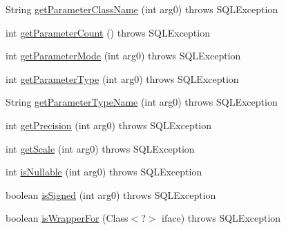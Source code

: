 \begin{DoxyCompactItemize}
\item 
String \mbox{\hyperlink{classcom_1_1mysql_1_1cj_1_1jdbc_1_1_callable_statement_1_1_callable_statement_param_info_a3ec72f90cfc41e2b5955443c7d05526f}{get\+Parameter\+Class\+Name}} (int arg0)  throws S\+Q\+L\+Exception 
\item 
int \mbox{\hyperlink{classcom_1_1mysql_1_1cj_1_1jdbc_1_1_callable_statement_1_1_callable_statement_param_info_abe8981fc3546f97212d771661cea8278}{get\+Parameter\+Count}} ()  throws S\+Q\+L\+Exception 
\item 
int \mbox{\hyperlink{classcom_1_1mysql_1_1cj_1_1jdbc_1_1_callable_statement_1_1_callable_statement_param_info_a29edc8712b31ebf3d04dc4dbda0236e2}{get\+Parameter\+Mode}} (int arg0)  throws S\+Q\+L\+Exception 
\item 
int \mbox{\hyperlink{classcom_1_1mysql_1_1cj_1_1jdbc_1_1_callable_statement_1_1_callable_statement_param_info_af4b895d1e6c4677a4b113b9639226459}{get\+Parameter\+Type}} (int arg0)  throws S\+Q\+L\+Exception 
\item 
String \mbox{\hyperlink{classcom_1_1mysql_1_1cj_1_1jdbc_1_1_callable_statement_1_1_callable_statement_param_info_a66b79721144e4632d5b4ac9b2c74defc}{get\+Parameter\+Type\+Name}} (int arg0)  throws S\+Q\+L\+Exception 
\item 
int \mbox{\hyperlink{classcom_1_1mysql_1_1cj_1_1jdbc_1_1_callable_statement_1_1_callable_statement_param_info_aa91a9357eeb55a483e3837e19753cc7b}{get\+Precision}} (int arg0)  throws S\+Q\+L\+Exception 
\item 
int \mbox{\hyperlink{classcom_1_1mysql_1_1cj_1_1jdbc_1_1_callable_statement_1_1_callable_statement_param_info_ab73eeaea2c8a1c588bb558684c9c832c}{get\+Scale}} (int arg0)  throws S\+Q\+L\+Exception 
\item 
int \mbox{\hyperlink{classcom_1_1mysql_1_1cj_1_1jdbc_1_1_callable_statement_1_1_callable_statement_param_info_ac07415ffd8e984bdded13a3b6aa71737}{is\+Nullable}} (int arg0)  throws S\+Q\+L\+Exception 
\item 
boolean \mbox{\hyperlink{classcom_1_1mysql_1_1cj_1_1jdbc_1_1_callable_statement_1_1_callable_statement_param_info_aaf1c6f87942c68fba31c425741f1f965}{is\+Signed}} (int arg0)  throws S\+Q\+L\+Exception 
\item 
boolean \mbox{\hyperlink{classcom_1_1mysql_1_1cj_1_1jdbc_1_1_callable_statement_1_1_callable_statement_param_info_ac6702e5894e202014ab8d26bfd45e5c7}{is\+Wrapper\+For}} (Class$<$?$>$ iface)  throws S\+Q\+L\+Exception 
\end{DoxyCompactItemize}
